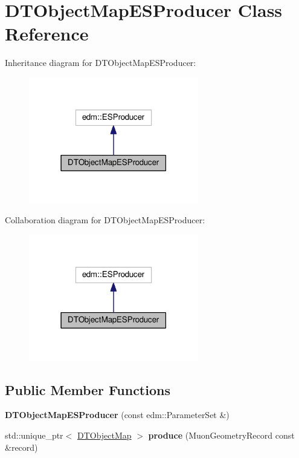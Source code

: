 \hypertarget{classDTObjectMapESProducer}{\section{D\-T\-Object\-Map\-E\-S\-Producer Class Reference}
\label{classDTObjectMapESProducer}
}


Inheritance diagram for D\-T\-Object\-Map\-E\-S\-Producer\-:
\nopagebreak
\begin{figure}[H]
\begin{center}
\leavevmode
\includegraphics[width=210pt]{classDTObjectMapESProducer__inherit__graph}
\end{center}
\end{figure}


Collaboration diagram for D\-T\-Object\-Map\-E\-S\-Producer\-:
\nopagebreak
\begin{figure}[H]
\begin{center}
\leavevmode
\includegraphics[width=210pt]{classDTObjectMapESProducer__coll__graph}
\end{center}
\end{figure}
\subsection*{Public Member Functions}
\begin{DoxyCompactItemize}
\item 
\hypertarget{classDTObjectMapESProducer_ab248ab7121d7e3febbafa0773d7ac9f6}{{\bfseries D\-T\-Object\-Map\-E\-S\-Producer} (const edm\-::\-Parameter\-Set \&)}\label{classDTObjectMapESProducer_ab248ab7121d7e3febbafa0773d7ac9f6}

\item 
\hypertarget{classDTObjectMapESProducer_a684484dd8a68820cbb4f26bcd0a23e39}{std\-::unique\-\_\-ptr$<$ \hyperlink{classDTObjectMap}{D\-T\-Object\-Map} $>$ {\bfseries produce} (Muon\-Geometry\-Record const \&record)}\label{classDTObjectMapESProducer_a684484dd8a68820cbb4f26bcd0a23e39}

\end{DoxyCompactItemize}
